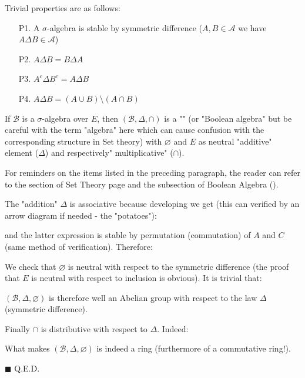 	Trivial properties are as follows:
	\begin{enumerate}
		\item[P1.] A $\sigma$-algebra is stable by symmetric difference ($A,B\in \mathcal{A}$ we have $A\Delta B\in \mathcal{A}$)
		
		\item[P2.] $A\Delta B=B\Delta A$
		\item[P3.] $A^c\Delta B^c=A\Delta B$
			
		\item[P4.] $A\Delta B=(A\cup B)\setminus (A\cap B)$
	\end{enumerate}
	\begin{theorem}
	If $\mathcal{B}$ is a $\sigma$-algebra over $E$, then $(\mathcal{B},\Delta,\cap)$ is a "" (or "Boolean algebra" but be careful with the term "algebra" here which can cause confusion with the corresponding structure in Set theory) with $\varnothing$ and $E$ as neutral "additive" element ($\Delta$) and respectively" multiplicative" ($\cap$).
	\end{theorem}
	\begin{tcolorbox}[title=Remark,colframe=black,arc=10pt]
	For reminders on the items listed in the preceding paragraph, the reader can refer to the section of Set Theory page \pageref{set theory} and the subsection of Boolean Algebra ().
	\end{tcolorbox}	
	\begin{dem}
	The "addition" $\Delta$ is associative because developing we get (this can verified by an arrow diagram if needed - the "potatoes"):
	
	and the latter expression is stable by permutation (commutation) of $A$ and $C$ (same method of verification). Therefore:
	
	We check that $\varnothing$ is neutral with respect to the symmetric difference (the proof that $E$ is neutral with respect to inclusion is obvious). It is trivial that:
	
	$(\mathcal{B},\Delta,\varnothing)$ is therefore well an Abelian group with respect to the law $\Delta$ (symmetric difference).
	
	Finally $\cap$ is distributive with respect to $\Delta$. Indeed:
	
	What makes $(\mathcal{B},\Delta,\varnothing)$ is indeed a ring (furthermore of a commutative ring!).
	\begin{flushright}
		$\blacksquare$  Q.E.D.
	\end{flushright}
	\end{dem}


